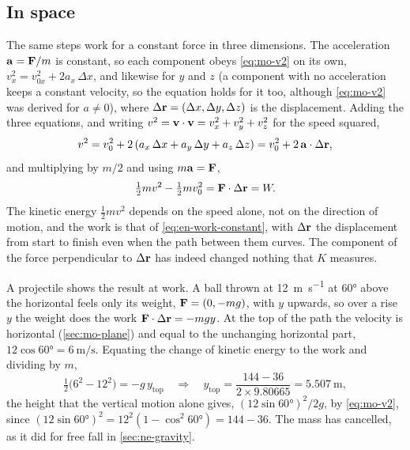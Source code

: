 \subsection*{In space}

The same steps work for a constant force in three dimensions. The
acceleration $\bm{\mathrm{a}} = \bm{\mathrm{F}}/m$ is constant, so each component obeys
\cref{eq:mo-v2} on its own, $v_x^2 = v_{0x}^2 + 2a_x\,\Delta x$, and
likewise for $y$ and $z$ (a component with no acceleration keeps a
constant velocity, so the equation holds for it too, although
\cref{eq:mo-v2} was derived for $a \neq 0$), where $\Delta\bm{\mathrm{r}} = (\Delta x, \Delta y,
\Delta z)$ is the displacement. Adding the three equations, and writing
$v^2 = \bm{\mathrm{v}}\cdot\bm{\mathrm{v}} = v_x^2 + v_y^2 + v_z^2$ for the speed squared,
\begin{equation*}
   v^2 = v_0^2 + 2\,(a_x\,\Delta x + a_y\,\Delta y + a_z\,\Delta z)
   = v_0^2 + 2\,\bm{\mathrm{a}}\cdot\Delta\bm{\mathrm{r}} ,
\end{equation*}
and multiplying by $m/2$ and using $m\bm{\mathrm{a}} = \bm{\mathrm{F}}$,
\begin{equation*}
   \tfrac12 m v^2 - \tfrac12 m v_0^2 = \bm{\mathrm{F}}\cdot\Delta\bm{\mathrm{r}} = W .
\end{equation*}
The kinetic energy $\frac12 m v^2$ depends on the speed alone, not on the
direction of motion, and the work is that of \cref{eq:en-work-constant},
with $\Delta\bm{\mathrm{r}}$ the displacement from start to finish even when the
path between them curves. The component of the force perpendicular to
$\Delta\bm{\mathrm{r}}$ has indeed changed nothing that $K$ measures.

A projectile shows the result at work. A ball thrown at
\SI{12}{\metre\per\second} at \ang{60} above the horizontal feels only its
weight, $\bm{\mathrm{F}} = (0, -mg)$, with $y$ upwards, so over a rise $y$ the
weight does the work $\bm{\mathrm{F}}\cdot\Delta\bm{\mathrm{r}} = -mgy$. At the top of the
path the velocity is horizontal (\cref{sec:mo-plane}) and equal to the
unchanging horizontal part, $12\cos\ang{60} = \SI{6}{\metre\per\second}$.
Equating the change of kinetic energy to the work and dividing by $m$,
\begin{equation*}
   \tfrac12\bigl(6^2 - 12^2\bigr) = -g\,y_{\mathrm{top}}
   \quad\Longrightarrow\quad
   y_{\mathrm{top}} = \frac{144 - 36}{2\times9.80665}
   = \SI{5.507}{\metre} ,
\end{equation*}
the height that the vertical motion alone gives, $(12\sin\ang{60})^2/2g$,
by \cref{eq:mo-v2}, since $(12\sin\ang{60})^2 = 12^2(1 - \cos^2\ang{60})
= 144 - 36$. The mass has cancelled, as it did for free fall in
\cref{sec:ne-gravity}.

